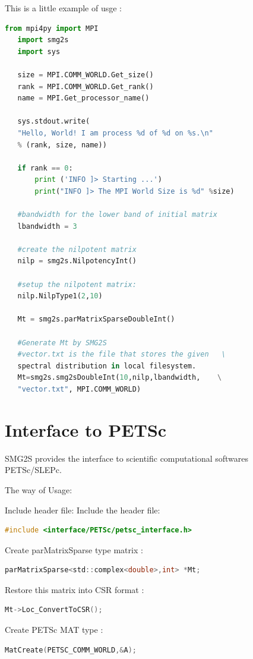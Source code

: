 \documentclass[a4paper, 10 pt]{report}
\begin{document}
   This is	a little example of usge :
	\begin{lstlisting}[language=Python,frame=single]
   from mpi4py import MPI
   import smg2s
   import sys

   size = MPI.COMM_WORLD.Get_size()
   rank = MPI.COMM_WORLD.Get_rank()
   name = MPI.Get_processor_name()

   sys.stdout.write(
   "Hello, World! I am process %d of %d on %s.\n"
   % (rank, size, name))

   if rank == 0:
       print ('INFO ]> Starting ...')
       print("INFO ]> The MPI World Size is %d" %size)

   #bandwidth for the lower band of initial matrix
   lbandwidth = 3

   #create the nilpotent matrix
   nilp = smg2s.NilpotencyInt()

   #setup the nilpotent matrix:
   nilp.NilpType1(2,10)

   Mt = smg2s.parMatrixSparseDoubleInt()

   #Generate Mt by SMG2S
   #vector.txt is the file that stores the given   \
   spectral distribution in local filesystem.
   Mt=smg2s.smg2sDoubleInt(10,nilp,lbandwidth,    \
   "vector.txt", MPI.COMM_WORLD)
	\end{lstlisting}
	\section{Interface to PETSc}
	
	SMG2S provides the interface to scientific computational softwares PETSc/SLEPc.
	
	The way of Usage:
	
	Include header file:
	Include the header file:
   \begin{lstlisting}[language=C,frame=single]
   #include <interface/PETSc/petsc_interface.h>
   \end{lstlisting}
	
	Create parMatrixSparse type matrix :
   \begin{lstlisting}[language=C,frame=single]
  parMatrixSparse<std::complex<double>,int> *Mt;
   \end{lstlisting}

	Restore this matrix into CSR format :
   \begin{lstlisting}[language=C,frame=single]
   Mt->Loc_ConvertToCSR();
	\end{lstlisting}

	Create PETSc MAT type :
   \begin{lstlisting}[language=C,frame=single]
   MatCreate(PETSC_COMM_WORLD,&A); 
	\end{lstlisting}
\end{document}
